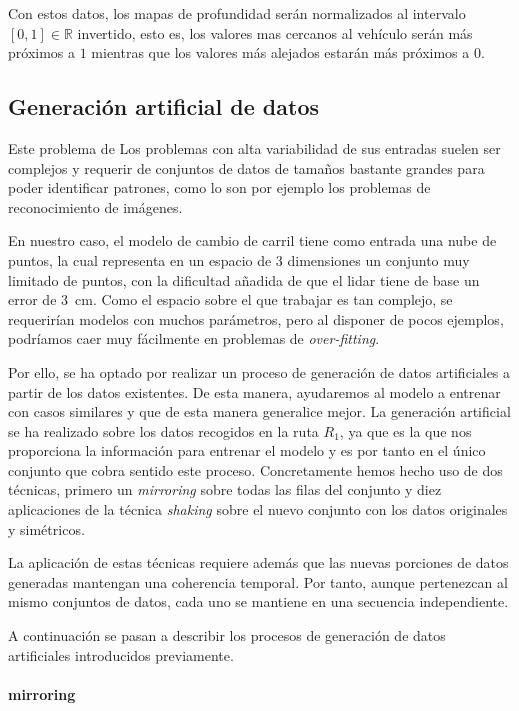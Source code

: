 Con estos datos, los mapas de profundidad serán normalizados al intervalo $[0, 1] \in \mathbb{R}$ invertido, esto es, los valores mas cercanos al vehículo serán más próximos a $1$ mientras que los valores más alejados estarán más próximos a $0$.

\subsection{Generación artificial de datos}

Este problema de Los problemas con alta variabilidad de sus entradas suelen ser complejos y requerir de conjuntos de datos de tamaños bastante grandes para poder identificar patrones, como lo son por ejemplo los problemas de reconocimiento de imágenes.

En nuestro caso, el modelo de cambio de carril tiene como entrada una nube de puntos, la cual representa en un espacio de $3$ dimensiones un conjunto muy limitado de puntos, con la dificultad añadida de que el \acrshort{lidar} tiene de base un error de \SI{3}{\cm}. Como el espacio sobre el que trabajar es tan complejo, se requerirían modelos con muchos parámetros, pero al disponer de pocos ejemplos, podríamos caer muy fácilmente en problemas de \textit{over-fitting}.

Por ello, se ha optado por realizar un proceso de generación de datos artificiales a partir de los datos existentes. De esta manera, ayudaremos al modelo a entrenar con casos similares y que de esta manera generalice mejor. La generación artificial se ha realizado sobre los datos recogidos en la ruta $R_1$, ya que es la que nos proporciona la información para entrenar el modelo y es por tanto en el único conjunto que cobra sentido este proceso. Concretamente hemos hecho uso de dos técnicas, primero un \textit{mirroring} sobre todas las filas del conjunto y diez aplicaciones de la técnica \textit{shaking} sobre el nuevo conjunto con los datos originales y simétricos.

La aplicación de estas técnicas requiere además que las nuevas porciones de datos generadas mantengan una coherencia temporal. Por tanto, aunque pertenezcan al mismo conjuntos de datos, cada uno se mantiene en una secuencia independiente.

A continuación se pasan a describir los procesos de generación de datos artificiales introducidos previamente.

\paragraph{mirroring}

